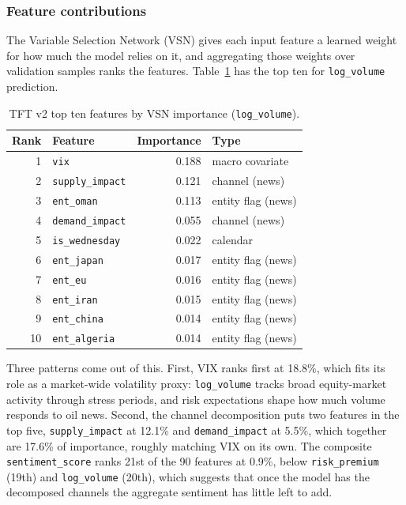 \subsubsection{Feature contributions}\label{sec:feature-importance}

The Variable Selection Network (VSN) gives each input feature a learned weight for how much the model relies on it, and aggregating those weights over validation samples ranks the features. Table~\ref{tab:feature-importance} has the top ten for \texttt{log\_volume} prediction.

\begin{table}[h]
  \centering
  \caption{TFT v2 top ten features by VSN importance (\texttt{log\_volume}).}
  \label{tab:feature-importance}
  \begin{tabular}{@{}rlrl@{}}
    \toprule
    Rank & Feature & Importance & Type \\
    \midrule
    1 & \texttt{vix} & 0.188 & macro covariate \\
    2 & \texttt{supply\_impact} & 0.121 & channel (news) \\
    3 & \texttt{ent\_oman} & 0.113 & entity flag (news) \\
    4 & \texttt{demand\_impact} & 0.055 & channel (news) \\
    5 & \texttt{is\_wednesday} & 0.022 & calendar \\
    6 & \texttt{ent\_japan} & 0.017 & entity flag (news) \\
    7 & \texttt{ent\_eu} & 0.016 & entity flag (news) \\
    8 & \texttt{ent\_iran} & 0.015 & entity flag (news) \\
    9 & \texttt{ent\_china} & 0.014 & entity flag (news) \\
    10 & \texttt{ent\_algeria} & 0.014 & entity flag (news) \\
    \bottomrule
  \end{tabular}
\end{table}

Three patterns come out of this. First, VIX ranks first at 18.8\%, which fits its role as a market-wide volatility proxy: \texttt{log\_volume} tracks broad equity-market activity through stress periods, and risk expectations shape how much volume responds to oil news. Second, the channel decomposition puts two features in the top five, \texttt{supply\_impact} at 12.1\% and \texttt{demand\_impact} at 5.5\%, which together are 17.6\% of importance, roughly matching VIX on its own. The composite \texttt{sentiment\_score} ranks 21st of the 90 features at 0.9\%, below \texttt{risk\_premium} (19th) and \texttt{log\_volume} (20th), which suggests that once the model has the decomposed channels the aggregate sentiment has little left to add.

